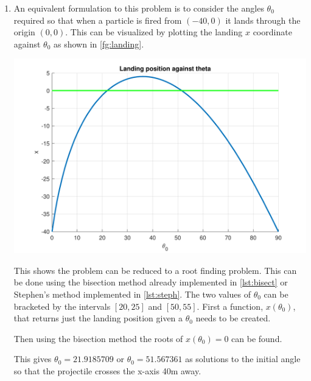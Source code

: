 \documentclass[a4paper,11pt]{article}
\begin{document}
\begin{enumerate}
	
	\item An equivalent formulation to this problem is to consider the angles 
	$\theta_{0}$ required so that when a particle is fired from $(-40,0)$ it 
	lands through the origin $(0,0)$. This can be visualized by plotting the 
	landing $x$ coordinate against $\theta_{0}$ as shown in 
	\autoref{fg:landing}.
	\begin{center}
		\includegraphics[scale=0.7]{images/Q3f.pdf}
		\label{fg:landing}
	\end{center}
	This shows the problem can be reduced to a root finding problem. This can 
	be done using the bisection method already implemented in 
	\autoref{lst:bisect} or Stephen's method implemented in 
	\autoref{lst:steph}. The two values of $\theta_{0}$ can be bracketed by 
	the 
	intervals $[20,25]$ and $[50,55]$. First a function, $x(\theta_{0})$, 
	that 
	returns just the 
	landing 
	position given a $\theta_{0}$ needs to be created.
	
	Then using the bisection method the roots of $x(\theta_{0}) = 0$ can be 
	found.
	
	This gives $\theta_{0} = 21.9185709$ or $\theta_{0} = 51.567361$ as 
	solutions to the initial angle so that the projectile crosses the x-axis 
	40m away.
\end{enumerate}
\newpage
\printbibliography
\newpage
\end{document}
